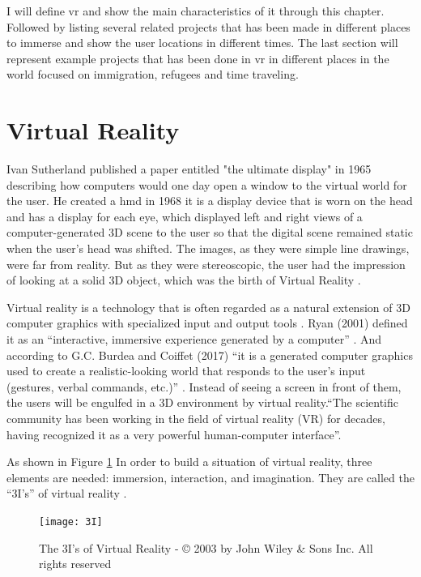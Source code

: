 \label{StateoftheArt}I will define \acrfull{vr} and show the main characteristics of it through this chapter. Followed by listing several related projects that has been made in different places to immerse and show the user locations in different times. The last section will represent example projects that has been done in \acrshort{vr} in different places in the world focused on immigration, refugees and time traveling.   

\section{Virtual Reality}
Ivan Sutherland published a paper entitled "the ultimate display" in 1965 describing how computers would one day open a window to the virtual world for the user. He created a \acrfull{hmd} in 1968 it is a display device that is worn on the head and has a display for each eye, which displayed left and right views of a computer-generated 3D scene to the user so that the digital scene remained static when the user's head was shifted. The images, as they were simple line drawings, were far from reality. But as they were stereoscopic, the user had the impression of looking at a solid 3D object, which was the birth of Virtual Reality \citep{Vince2011}.  

Virtual reality is a technology that is often regarded as a natural extension of 3D computer graphics with specialized input and output tools \citep{Jayaram1997}. Ryan (2001) defined it as an “interactive, immersive experience generated by a computer” \citep{Ryan2001}. And according to G.C. Burdea and Coiffet (2017) “it is a generated computer graphics used to create a realistic-looking world that responds to the user’s input (gestures, verbal commands, etc.)” \cite[p.20]{burdea2017virtual}. Instead of seeing a screen in front of them, the users will be engulfed in a 3D environment by virtual reality.“The scientific community has been working in the field of virtual reality (VR) for decades, having recognized it as a very powerful human-computer interface”\cite[p.19]{burdea2017virtual}. 

As shown in Figure \ref{fig:3I} In order to build a situation of virtual reality, three elements are needed:  immersion, interaction, and imagination. They are called the “3I’s” of virtual reality \citep{Hu2016,burdea2017virtual,Bamodu2013VirtualComponents}.

\begin{figure} %
    \centering
    \texttt{[image: 3I]}
    \caption{The 3I's of Virtual Reality - © 2003 by John Wiley \& Sons Inc. All rights
reserved}
    \label{fig:3I}
\end{figure}



